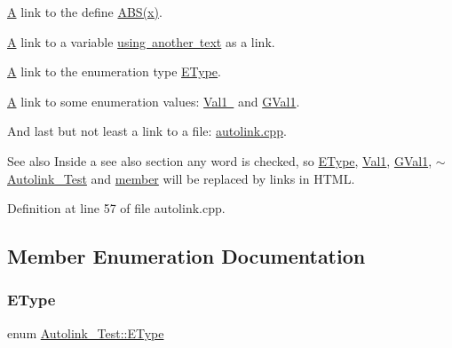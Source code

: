 \mbox{\hyperlink{class_a}{A}} link to the define \mbox{\hyperlink{define_8h_a996f7be338ccb40d1a2a5abc1ad61759}{A\+B\+S(x)}}.

\mbox{\hyperlink{class_a}{A}} link to a variable \mbox{\hyperlink{class_autolink___test_a8de85603114bc9b9e53bd40764e9b499}{using another text}} as a link.

\mbox{\hyperlink{class_a}{A}} link to the enumeration type \mbox{\hyperlink{class_autolink___test_aeb611627c332d067bded1806b1bb45c2}{E\+Type}}.

\mbox{\hyperlink{class_a}{A}} link to some enumeration values\+: \mbox{\hyperlink{class_autolink___test_aeb611627c332d067bded1806b1bb45c2af70631e295bce280e74762d18af47a94}{Val1 }} and \mbox{\hyperlink{autolink_8cpp_a656d63cf384d2a6f23c2c18523a7bc5ea0f016f49e4f3bcd072319b9d68bc927d}{G\+Val1}}.

And last but not least a link to a file\+: \mbox{\hyperlink{autolink_8cpp}{autolink.\+cpp}}.

\begin{DoxySeeAlso}{See also}
Inside a see also section any word is checked, so \mbox{\hyperlink{class_autolink___test_aeb611627c332d067bded1806b1bb45c2}{E\+Type}}, \mbox{\hyperlink{class_autolink___test_aeb611627c332d067bded1806b1bb45c2af70631e295bce280e74762d18af47a94}{Val1}}, \mbox{\hyperlink{autolink_8cpp_a656d63cf384d2a6f23c2c18523a7bc5ea0f016f49e4f3bcd072319b9d68bc927d}{G\+Val1}}, \mbox{\hyperlink{class_autolink___test_a03bf46c8e2b733680035f524fd7b193b}{$\sim$\+Autolink\+\_\+\+Test}} and \mbox{\hyperlink{class_autolink___test_a393ea281f235a2f603d98daf72b0d411}{member}} will be replaced by links in H\+T\+ML. 
\end{DoxySeeAlso}


Definition at line 57 of file autolink.\+cpp.



\subsection{Member Enumeration Documentation}
\mbox{\label{class_autolink___test_aeb611627c332d067bded1806b1bb45c2}} 
\subsubsection{\texorpdfstring{EType}{EType}}
{\footnotesize\ttfamily enum \mbox{\hyperlink{class_autolink___test_aeb611627c332d067bded1806b1bb45c2}{Autolink\+\_\+\+Test\+::\+E\+Type}}}



